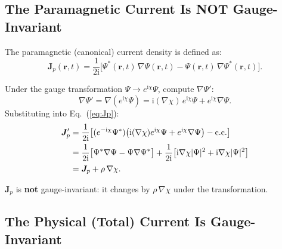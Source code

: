 \documentclass[12pt,letterpaper]{article}
\newcommand{\ii}{\mathrm{i}}
\theoremstyle{definition}
\begin{document}
\subsection{The Paramagnetic Current Is NOT Gauge-Invariant}

The paramagnetic (canonical) current density is defined as:
\begin{equation}
  \bm{J}_p(\bm{r},t) = \frac{1}{2\ii}\bigl[
    \Psi^*(\bm{r},t)\,\nabla\Psi(\bm{r},t)
    - \Psi(\bm{r},t)\,\nabla\Psi^*(\bm{r},t)
  \bigr].
  \label{eq:Jp}
\end{equation}

\begin{derivbox}
Under the gauge transformation $\Psi\to e^{\ii\chi}\Psi$, compute
$\nabla\Psi'$:
\begin{equation}
  \nabla\Psi' = \nabla(e^{\ii\chi}\Psi)
  = \ii(\nabla\chi)\,e^{\ii\chi}\Psi + e^{\ii\chi}\nabla\Psi.
  \label{eq:grad_psi_gauge}
\end{equation}
Substituting into Eq.~(\ref{eq:Jp}):
\begin{align}
  \bm{J}_p' &= \frac{1}{2\ii}\bigl[
    (e^{-\ii\chi}\Psi^*)
    \bigl(\ii(\nabla\chi)e^{\ii\chi}\Psi + e^{\ii\chi}\nabla\Psi\bigr)
    - \text{c.c.}
  \bigr] \notag\\
  &= \frac{1}{2\ii}\bigl[
    \Psi^*\nabla\Psi - \Psi\nabla\Psi^*
  \bigr]
  + \frac{1}{2\ii}\bigl[
    \ii\nabla\chi|\Psi|^2 + \ii\nabla\chi|\Psi|^2
  \bigr] \notag\\
  &= \bm{J}_p + \rho\,\nabla\chi.
  \label{eq:Jp_gauge}
\end{align}
\end{derivbox}

\begin{keyresult}
$\bm{J}_p$ is \textbf{not} gauge-invariant: it changes by
$\rho\,\nabla\chi$ under the transformation.
\end{keyresult}

\subsection{The Physical (Total) Current Is Gauge-Invariant}
\end{document}
